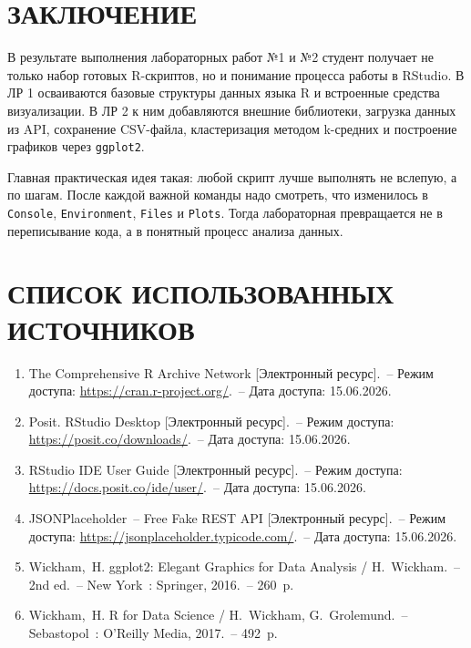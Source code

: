 \documentclass[14pt,a4paper]{extarticle}
\begin{document}
\newpage

\section*{ЗАКЛЮЧЕНИЕ}

В результате выполнения лабораторных работ №1 и №2 студент получает не только набор готовых R-скриптов, но и понимание процесса работы в RStudio. В ЛР 1 осваиваются базовые структуры данных языка R и встроенные средства визуализации. В ЛР 2 к ним добавляются внешние библиотеки, загрузка данных из API, сохранение CSV-файла, кластеризация методом k-средних и построение графиков через \texttt{ggplot2}.

Главная практическая идея такая: любой скрипт лучше выполнять не вслепую, а по шагам. После каждой важной команды надо смотреть, что изменилось в \texttt{Console}, \texttt{Environment}, \texttt{Files} и \texttt{Plots}. Тогда лабораторная превращается не в переписывание кода, а в понятный процесс анализа данных.

\newpage

\section*{СПИСОК ИСПОЛЬЗОВАННЫХ ИСТОЧНИКОВ}

\begin{enumerate}[label=\arabic*,leftmargin=1.25cm]
  \item The Comprehensive R Archive Network [Электронный ресурс].~-- Режим доступа: \url{https://cran.r-project.org/}.~-- Дата доступа: 15.06.2026.
  \item Posit. RStudio Desktop [Электронный ресурс].~-- Режим доступа: \url{https://posit.co/downloads/}.~-- Дата доступа: 15.06.2026.
  \item RStudio IDE User Guide [Электронный ресурс].~-- Режим доступа: \url{https://docs.posit.co/ide/user/}.~-- Дата доступа: 15.06.2026.
  \item JSONPlaceholder~-- Free Fake REST API [Электронный ресурс].~-- Режим доступа: \url{https://jsonplaceholder.typicode.com/}.~-- Дата доступа: 15.06.2026.
  \item Wickham,~H. ggplot2: Elegant Graphics for Data Analysis / H.~Wickham.~-- 2nd ed.~-- New York~: Springer, 2016.~-- 260~p.
  \item Wickham,~H. R for Data Science / H.~Wickham, G.~Grolemund.~-- Sebastopol~: O'Reilly Media, 2017.~-- 492~p.
\end{enumerate}
\end{document}
